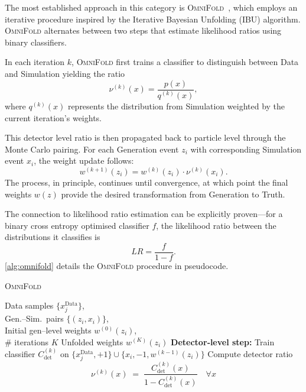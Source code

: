             The most established approach in this category is \textsc{OmniFold}~\cite{andreassen_omnifold_2020}, which employs an iterative procedure inspired by the Iterative Bayesian Unfolding (IBU) algorithm.
            \textsc{OmniFold} alternates between two steps that estimate likelihood ratios using binary classifiers.
            
            In each iteration \(k\), \textsc{OmniFold} first trains a classifier to distinguish between Data and Simulation yielding the ratio
            \begin{equation}
                \nu^{(k)}(x) = \frac{p(x)}{q^{(k)}(x)},
            \end{equation}
            where \(q^{(k)}(x)\) represents the distribution from Simulation weighted by the current iteration's weights.

            This detector level ratio is then propagated back to particle level through the Monte Carlo pairing.
            For each Generation event \(z_i\) with corresponding Simulation event \(x_i\), the weight update follows:
            \begin{equation}
                w^{(k+1)}(z_i) = w^{(k)}(z_i) \cdot \nu^{(k)}(x_i).
            \end{equation}
            The process, in principle, continues until convergence, at which point the final weights \(w(z)\) provide the desired transformation from Generation to Truth.
            
            The connection to likelihood ratio estimation can be explicitly proven---for a binary cross entropy optimised classifier \(f\), the likelihood ratio between the distributions it classifies is
            \[
                LR = \frac{f}{1-f}.
            \]
            \cref{alg:omnifold} details the \textsc{OmniFold} procedure in pseudocode.


\begin{algorithm}
  \caption{\textsc{OmniFold}}
  \label{alg:omnifold}
  \begin{algorithmic}[1]
    \Require 
      Data samples $\{x_j^{\mathrm{Data}}\}$,\\
      Gen.\!--Sim.\ pairs $\{(z_i,x_i)\}$,\\
      Initial gen–level weights $w^{(0)}(z_i)$,\\
      \# iterations $K$
    \Ensure 
      Unfolded weights $w^{(K)}(z_i)$
      \State \textbf{Detector‐level step:}
      \State Train classifier $C_{\text{det}}^{(k)}$ on
        $\{x_j^{\mathrm{Data}},+1\}\cup\{x_i,-1,w^{(k-1)}(z_i)\}$
      \State Compute detector ratio
        \[
          \nu^{(k)}(x)\;=\;\frac{C_{\text{det}}^{(k)}(x)}{1 - C_{\text{det}}^{(k)}(x)}
          \quad\forall x
        \]
    \end{algorithmic}
\end{algorithm}

